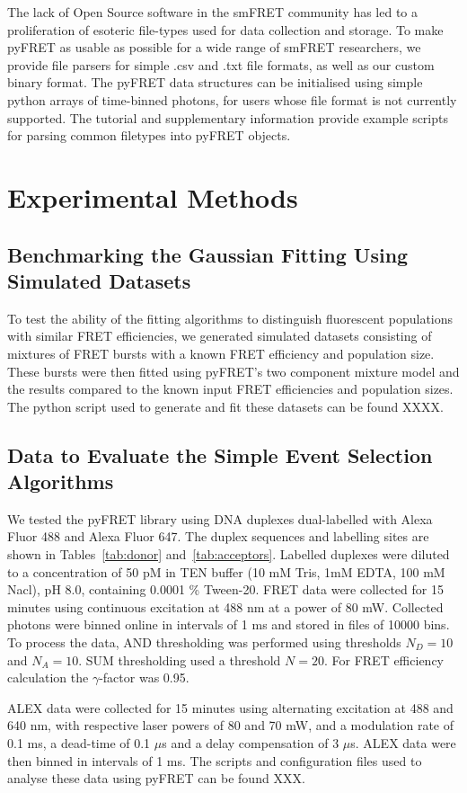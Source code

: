 \documentclass[10pt]{article}
\begin{document}
The lack of Open Source software in the smFRET community has led to a proliferation of esoteric file-types used for data collection and storage. To make pyFRET as usable as possible for a wide range of smFRET researchers, we provide file parsers for simple .csv and .txt file formats, as well as our custom binary format. The pyFRET data structures can be initialised using simple python arrays of time-binned photons, for users whose file format is not currently supported. The tutorial and supplementary information provide example scripts for parsing common filetypes into pyFRET objects.

\section*{Experimental Methods}
\subsection*{Benchmarking the Gaussian Fitting Using Simulated Datasets}
To test the ability of the fitting algorithms to distinguish fluorescent populations with similar FRET efficiencies, we generated simulated datasets consisting of mixtures of FRET bursts with a known FRET efficiency and population size. These bursts were then fitted using pyFRET's two component mixture model and the results compared to the known input FRET efficiencies and population sizes. The python script used to generate and fit these datasets can be found XXXX. 

\subsection*{Data to Evaluate the Simple Event Selection Algorithms}
We tested the pyFRET library using DNA duplexes dual-labelled with Alexa Fluor 488 and Alexa Fluor 647. The duplex sequences and labelling sites are shown in Tables~\ref{tab:donor} and~\ref{tab:acceptors}. Labelled duplexes were diluted to a concentration of 50 pM in TEN buffer (10 mM Tris, 1mM EDTA, 100 mM Nacl), pH 8.0, containing 0.0001 \% Tween-20. FRET data were collected for 15 minutes using continuous excitation at 488 nm at a power of 80 mW. Collected photons were binned online in intervals of 1 ms and stored in files of 10000 bins. To process the data, AND thresholding was performed using thresholds $N_D = 10$ and $N_A = 10$. SUM thresholding used a threshold $N = 20$. For FRET efficiency calculation the $\gamma$-factor was 0.95.

ALEX data were collected for 15 minutes using alternating excitation at 488 and 640 nm, with respective laser powers of 80 and 70 mW, and a modulation rate of 0.1 ms, a dead-time of 0.1 $\mu$s and a delay compensation of 3 $\mu$s. ALEX data were then binned in intervals of 1 ms. The scripts and configuration files used to analyse these data using pyFRET can be found XXX.
\end{document}
